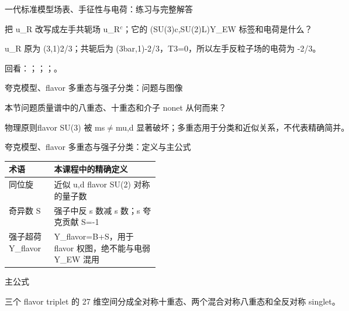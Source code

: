 \begin{frame}[t]{一代标准模型场表、手征性与电荷：练习与完整解答}
\footnotesize
\begin{block}{}把 u\_R 改写成左手共轭场 u\_R\ensuremath{^{c}}；它的 (SU(3)c,SU(2)L)Y\_EW 标签和电荷是什么？\end{block}
\begin{exampleblock}{}u\_R 原为 (3,1)2/\allowbreak{}3；共轭后为 (3bar,1)-2/\allowbreak{}3，T3=0，所以左手反粒子场的电荷为 -2/\allowbreak{}3。\end{exampleblock}
\vfill
\scriptsize 回看：；；；。
\end{frame}

\begin{frame}[t]{夸克模型、flavor 多重态与强子分类：问题与图像}
\footnotesize
\begin{block}{本节问题}质量谱中的八重态、十重态和介子 nonet 从何而来？\end{block}
\begin{block}{物理原则}\quad flavor SU(3) 被 ms\ensuremath{\ne}mu,d 显著破坏；多重态用于分类和近似关系，不代表精确简并。\end{block}
\end{frame}

\begin{frame}[t]{夸克模型、flavor 多重态与强子分类：定义与主公式}
\footnotesize\begin{tabularx}{\linewidth}{p{0.30\linewidth}Y}
\toprule 术语 & 本课程中的精确定义\\\midrule
{} 同位旋 & 近似 u,d flavor SU(2) 对称的量子数\\
 奇异数 S & 强子中反 s 数减 s 数；s 夸克贡献 S=-1\\
 强子超荷 Y\_flavor & Y\_flavor=B+S，用于 flavor 权图，绝不能与电弱 Y\_EW 混用\\
\bottomrule\end{tabularx}\vspace{0.15cm}
\begin{block}{ 主公式}\centering{}\end{block}
三个 flavor triplet 的 27 维空间分成全对称十重态、两个混合对称八重态和全反对称 singlet。
\end{frame}

